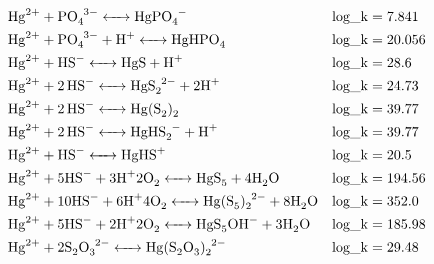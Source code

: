 \documentclass[12pt, a4paper]{article}
\begin{document}
\begin{align}
& \ce{Hg^2+ + PO_4^3- <-> HgPO_4^-} && \mathrm{log\_k} = 7.841 \\
& \ce{Hg^2+ + PO_4^3- + H+ <-> HgHPO_4} && \mathrm{log\_k} = 20.056 \\
& \ce{Hg^2+ + HS^- <-> HgS + H^+} && \mathrm{log\_k} = 28.6 \\
& \ce{Hg^2+ + 2HS^- <-> HgS_2^2- + 2 H^+} && \mathrm{log\_k} = 24.73 \\
& \ce{Hg^2+ + 2HS^- <-> Hg(S_2)_2} && \mathrm{log\_k} = 39.77 \\
& \ce{Hg^2+ + 2HS^- <-> HgHS_2^- + H+} && \mathrm{log\_k} = 39.77 \\
& \ce{Hg^2+ + HS^- <-> HgHS^+} && \mathrm{log\_k} = 20.5 \\
& \ce{Hg^2+ + 5 HS^- + 3 H^+ 2 O_2 <-> HgS_5 + 4 H2O} && \mathrm{log\_k} = 194.56 \\
& \ce{Hg^2+ + 10 HS^- + 6 H^+ 4 O_2 <-> Hg(S_5)_2^2- + 8 H2O} && \mathrm{log\_k} = 352.0 \\
& \ce{Hg^2+ + 5 HS^- + 2 H^+ 2 O_2 <-> HgS_5OH^- + 3 H2O} && \mathrm{log\_k} = 185.98 \\
& \ce{Hg^2+ + 2 S_2O_3^2- <-> Hg(S2O3)_2^2-} && \mathrm{log\_k} = 29.48 \\

\end{align}
\end{document}
